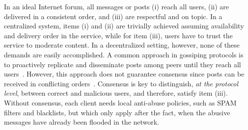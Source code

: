 \documentclass[12pt]{article}
\begin{document}
In an ideal Internet forum, all messages or posts
(i)   reach all users,
(ii)  are delivered in a consistent order, and
(iii) are respectful and on topic.
In a centralized system, items (i) and (ii) are trivially achieved assuming
availability and delivery order in the service, while for item (iii), users
have to trust the service to moderate content.
In a decentralized setting, however, none of these demands are easily
accomplished.
A common approach in gossiping protocols is to proactively replicate and
disseminate posts among peers until they reach all
users~\cite{p2p.survey,p2p.byz}.
However, this approach does not guarantee consensus since posts can be received
in conflicting orders~\cite{p2p.intention,p2p.dvcs}.
%
Consensus is key to distinguish, \emph{at the protocol level}, between correct
and malicious users, and therefore, satisfy item (iii).
Without consensus, each client needs local anti-abuse policies, such as SPAM
filters and blacklists, but which only apply after the fact, when the abusive
messages have already been flooded in the network.
%

\end{document}
